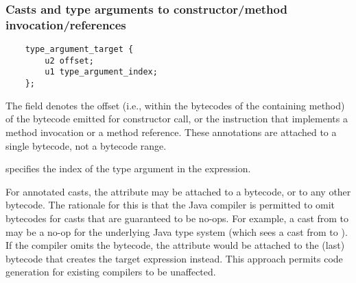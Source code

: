 \documentclass[10pt]{article}
\newcommand{\preverbnegspace}{\vspace{-5pt}}
\begin{document}



\subsubsection{Casts and type arguments to constructor/method invocation/references\label{class-file:ext:ri:cast}\label{class-file:ext:ri:con-typearg}\label{class-file:ext:ri:mref-typearg}\label{class-file:ext:ri:cref-typearg}}


\preverbnegspace
\begin{Verbatim}
    type_argument_target {
        u2 offset;
        u1 type_argument_index;
    };
\end{Verbatim}

The  field denotes the offset (i.e., within the bytecodes
of the containing method) of the  bytecode emitted for
constructor call, or the
instruction that implements a
method invocation or a method reference.  These annotations
are attached to a single bytecode, not a bytecode range.

 specifies the index of the type argument in the
expression.


For annotated casts, the attribute may be attached to a
 bytecode, or to any other bytecode.  The rationale for
this is that the Java compiler is permitted to omit 
bytecodes for casts that are guaranteed to be no-ops.  For example, a
cast from  to  may be a no-op for the
underlying Java type system (which sees a cast from  to
).  If the compiler omits the  bytecode, the
 attribute would be attached to the (last) bytecode that
creates the target expression instead.  This approach permits code
generation for existing compilers to be unaffected.
\end{document}
